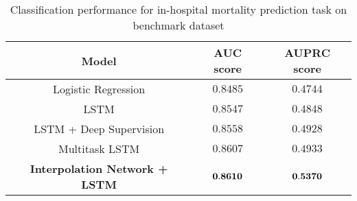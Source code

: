 \documentclass{article} \usepackage{iclr2019_conference,times}
\begin{document}
\begin{table}[h]
\caption{Classification performance for in-hospital mortality prediction task on benchmark dataset}
\begin{center}
\begin{tabular}{ c c c} 
 \toprule
 {\bf Model} & {\bf AUC score} & {\bf AUPRC score}\\
 \midrule
 Logistic Regression & $0.8485$ & $0.4744$ \\
 LSTM & $0.8547$ & $0.4848$ \\
 LSTM + Deep Supervision & $0.8558$ & $0.4928$ \\
 Multitask LSTM & $0.8607$ & $0.4933$ \\ 
 {\bf Interpolation Network + LSTM} & ${\bf 0.8610}$ & ${\bf 0.5370}$\\
 \bottomrule
 \end{tabular}
\end{center}
\label{table:benchmark}
\end{table}



 



 
\end{document}
